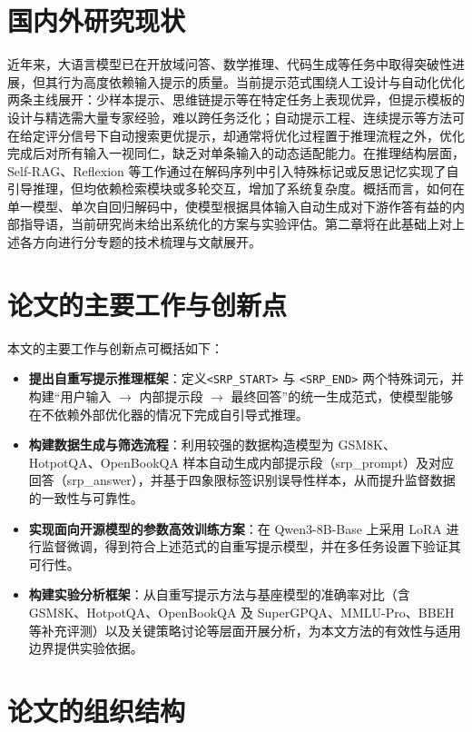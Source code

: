 \section{国内外研究现状}
\label{section:domestic-review}

近年来，大语言模型已在开放域问答、数学推理、代码生成等任务中取得突破性进展，但其行为高度依赖输入提示的质量。当前提示范式围绕人工设计与自动化优化两条主线展开：少样本提示、思维链提示等在特定任务上表现优异，但提示模板的设计与精选需大量专家经验，难以跨任务泛化；自动提示工程、连续提示等方法可在给定评分信号下自动搜索更优提示，却通常将优化过程置于推理流程之外，优化完成后对所有输入一视同仁，缺乏对单条输入的动态适配能力。在推理结构层面，Self-RAG、Reflexion 等工作通过在解码序列中引入特殊标记或反思记忆实现了自引导推理，但均依赖检索模块或多轮交互，增加了系统复杂度。概括而言，如何在单一模型、单次自回归解码中，使模型根据具体输入自动生成对下游作答有益的内部指导语，当前研究尚未给出系统化的方案与实验评估。第二章将在此基础上对上述各方向进行分专题的技术梳理与文献展开。

\section{论文的主要工作与创新点}

本文的主要工作与创新点可概括如下：

\begin{itemize}
    \item \textbf{提出自重写提示推理框架}：定义\texttt{<SRP\_START>} 与 \texttt{<SRP\_END>} 两个特殊词元，并构建“用户输入 $\rightarrow$ 内部提示段 $\rightarrow$ 最终回答”的统一生成范式，使模型能够在不依赖外部优化器的情况下完成自引导式推理。
    \item \textbf{构建数据生成与筛选流程}：利用较强的数据构造模型为 GSM8K、HotpotQA、OpenBookQA 样本自动生成内部提示段（srp\_prompt）及对应回答（srp\_answer），并基于四象限标签识别误导性样本，从而提升监督数据的一致性与可靠性。
    \item \textbf{实现面向开源模型的参数高效训练方案}：在 Qwen3-8B-Base 上采用 LoRA 进行监督微调，得到符合上述范式的自重写提示模型，并在多任务设置下验证其可行性。
    \item \textbf{构建实验分析框架}：从自重写提示方法与基座模型的准确率对比（含 GSM8K、HotpotQA、OpenBookQA 及 SuperGPQA、MMLU-Pro、BBEH 等补充评测）以及关键策略讨论等层面开展分析，为本文方法的有效性与适用边界提供实验依据。
\end{itemize}

\section{论文的组织结构}

